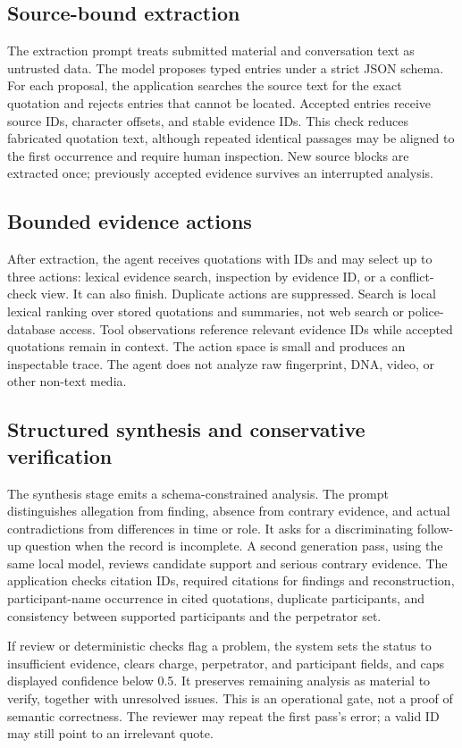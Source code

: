 \documentclass[10pt,a4paper]{article}
\begin{document}
\subsection{Source-bound extraction}
The extraction prompt treats submitted material and conversation text as untrusted data. The model proposes typed entries under a strict JSON schema. For each proposal, the application searches the source text for the exact quotation and rejects entries that cannot be located. Accepted entries receive source IDs, character offsets, and stable evidence IDs. This check reduces fabricated quotation text, although repeated identical passages may be aligned to the first occurrence and require human inspection. New source blocks are extracted once; previously accepted evidence survives an interrupted analysis.

\subsection{Bounded evidence actions}
After extraction, the agent receives quotations with IDs and may select up to three actions: lexical evidence search, inspection by evidence ID, or a conflict-check view. It can also finish. Duplicate actions are suppressed. Search is local lexical ranking over stored quotations and summaries, not web search or police-database access. Tool observations reference relevant evidence IDs while accepted quotations remain in context. The action space is small and produces an inspectable trace. The agent does not analyze raw fingerprint, DNA, video, or other non-text media.

\subsection{Structured synthesis and conservative verification}
The synthesis stage emits a schema-constrained analysis. The prompt distinguishes allegation from finding, absence from contrary evidence, and actual contradictions from differences in time or role. It asks for a discriminating follow-up question when the record is incomplete. A second generation pass, using the same local model, reviews candidate support and serious contrary evidence. The application checks citation IDs, required citations for findings and reconstruction, participant-name occurrence in cited quotations, duplicate participants, and consistency between supported participants and the perpetrator set.

If review or deterministic checks flag a problem, the system sets the status to insufficient evidence, clears charge, perpetrator, and participant fields, and caps displayed confidence below 0.5. It preserves remaining analysis as material to verify, together with unresolved issues. This is an operational gate, not a proof of semantic correctness. The reviewer may repeat the first pass's error; a valid ID may still point to an irrelevant quote.
\end{document}
